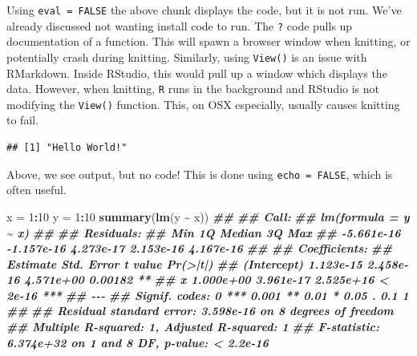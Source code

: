 \documentclass[
]{book}
\newenvironment{Shaded}{\begin{snugshade}}{\end{snugshade}}
\newcommand{\DecValTok}[1]{\textcolor[rgb]{0.00,0.00,0.81}{#1}}
\newcommand{\DocumentationTok}[1]{\textcolor[rgb]{0.56,0.35,0.01}{\textbf{\textit{#1}}}}
\newcommand{\FunctionTok}[1]{\textcolor[rgb]{0.13,0.29,0.53}{\textbf{#1}}}
\newcommand{\NormalTok}[1]{#1}
\newcommand{\OtherTok}[1]{\textcolor[rgb]{0.56,0.35,0.01}{#1}}
\newcommand{\SpecialCharTok}[1]{\textcolor[rgb]{0.81,0.36,0.00}{\textbf{#1}}}
\theoremstyle{definition}
\theoremstyle{definition}
\theoremstyle{definition}
\theoremstyle{definition}
\theoremstyle{remark}
\begin{document}
Using \texttt{eval\ =\ FALSE} the above chunk displays the code, but it is not run. We've already discussed not wanting install code to run. The \texttt{?} code pulls up documentation of a function. This will spawn a browser window when knitting, or potentially crash during knitting. Similarly, using \texttt{View()} is an issue with RMarkdown. Inside RStudio, this would pull up a window which displays the data. However, when knitting, \texttt{R} runs in the background and RStudio is not modifying the \texttt{View()} function. This, on OSX especially, usually causes knitting to fail.

\begin{verbatim}
## [1] "Hello World!"
\end{verbatim}

Above, we see output, but no code! This is done using \texttt{echo\ =\ FALSE}, which is often useful.

\begin{Shaded}
\begin{Highlighting}[]
\NormalTok{    x }\OtherTok{=} \DecValTok{1}\SpecialCharTok{:}\DecValTok{10}
\NormalTok{    y }\OtherTok{=} \DecValTok{1}\SpecialCharTok{:}\DecValTok{10}
    \FunctionTok{summary}\NormalTok{(}\FunctionTok{lm}\NormalTok{(y }\SpecialCharTok{\textasciitilde{}}\NormalTok{ x))}
\DocumentationTok{\#\# }
\DocumentationTok{\#\# Call:}
\DocumentationTok{\#\# lm(formula = y \textasciitilde{} x)}
\DocumentationTok{\#\# }
\DocumentationTok{\#\# Residuals:}
\DocumentationTok{\#\#        Min         1Q     Median         3Q        Max }
\DocumentationTok{\#\# {-}5.661e{-}16 {-}1.157e{-}16  4.273e{-}17  2.153e{-}16  4.167e{-}16 }
\DocumentationTok{\#\# }
\DocumentationTok{\#\# Coefficients:}
\DocumentationTok{\#\#              Estimate Std. Error   t value Pr(\textgreater{}|t|)    }
\DocumentationTok{\#\# (Intercept) 1.123e{-}15  2.458e{-}16 4.571e+00  0.00182 ** }
\DocumentationTok{\#\# x           1.000e+00  3.961e{-}17 2.525e+16  \textless{} 2e{-}16 ***}
\DocumentationTok{\#\# {-}{-}{-}}
\DocumentationTok{\#\# Signif. codes:  0 \textquotesingle{}***\textquotesingle{} 0.001 \textquotesingle{}**\textquotesingle{} 0.01 \textquotesingle{}*\textquotesingle{} 0.05 \textquotesingle{}.\textquotesingle{} 0.1 \textquotesingle{} \textquotesingle{} 1}
\DocumentationTok{\#\# }
\DocumentationTok{\#\# Residual standard error: 3.598e{-}16 on 8 degrees of freedom}
\DocumentationTok{\#\# Multiple R{-}squared:      1,  Adjusted R{-}squared:      1 }
\DocumentationTok{\#\# F{-}statistic: 6.374e+32 on 1 and 8 DF,  p{-}value: \textless{} 2.2e{-}16}
\end{Highlighting}
\end{Shaded}
\end{document}
